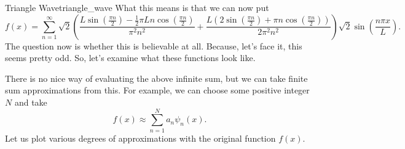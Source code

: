 \begin{ex}{Triangle Wave}{triangle_wave}
	What this means is that we can now put
	\[
		f(x) = \sum_{n=1}^\infty \sqrt{2}\left(\frac{L\sin\left(\frac{\pi n}{2}\right)-\frac{1}{2}\pi Ln\cos\left(\frac{\pi n}{2}\right)}{\pi^{2}n^{2}}
+\frac{L\left(2\sin\left(\frac{\pi n}{2}\right)+\pi n\cos\left(\frac{\pi n}{2}\right)\right)}{2\pi^{2}n^{2}}\right) \sqrt{2}\sin\left(\frac{n\pi x}{L}\right).
	\]
	The question now is whether this is believable at all. Because, let's face it, this seems pretty odd. So, let's examine what these functions look like.

	There is no nice way of evaluating the above infinite sum, but we can take finite sum approximations from this. For example, we can choose some positive integer $N$ and take
	\[
		f(x)\approx \sum_{n=1}^N a_n \psi_n(x).
	\]
	Let us plot various degrees of approximations with the original function $f(x)$.


\end{ex}
